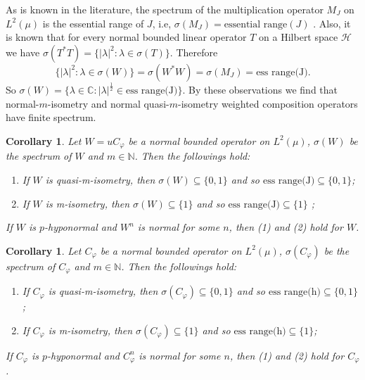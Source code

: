 \documentclass{amsart}
\newtheorem{cor}[thm]{Corollary}
\theoremstyle{definition}\newtheorem{defn}[thm]{Definition}
\theoremstyle{remark}
\numberwithin{equation}{section}
\begin{document}
As is known in the literature, the spectrum of the multiplication operator $M_J$ on $L^2(\mu)$ is the essential range of $J$, i.e, $\sigma(M_J)=\text{essential range}(J)$ . Also, it is known that for every normal bounded linear operator $T$ on a Hilbert space $\mathcal{H}$ we have $\sigma(T^*T)=\{|\lambda|^2:\lambda\in \sigma(T)\}$. Therefore 
$$\{|\lambda|^2:\lambda\in \sigma(W)\}=\sigma(W^*W)=\sigma(M_J)=\text{ess\ range(J)}.$$
So $\sigma(W)=\{\lambda\in \mathbb{C}: |\lambda|^{\frac{1}{2}}\in \text{ess\ range(J)}\}$. By these observations we find that normal-$m$-isometry and normal quasi-$m$-isometry weighted composition operators have finite spectrum.
\begin{cor}
Let $W=uC_{\varphi}$ be a normal bounded operator on $L^2(\mu)$, $\sigma(W)$ be the spectrum of $W$ and $m\in \mathbb{N}$. Then the followings hold:\\
\begin{enumerate}
\item If $W$ is quasi-m-isometry, then $\sigma(W)\subseteq \{0,1\}$ and so $\text{ess\ range(J)}\subseteq \{0,1\}$;

\item If $W$ is m-isometry, then $\sigma(W)\subseteq \{1\}$ and so $\text{ess\ range(J)}\subseteq \{1\}$ ;
\end{enumerate}
 If $W$ is $p$-hyponormal and $W^n$ is normal for some $n$, then (1) and (2) hold for $W$.

\end{cor}

\begin{cor}
Let $C_{\varphi}$ be a normal bounded operator on $L^2(\mu)$, $\sigma(C_{\varphi})$ be the spectrum of $C_{\varphi}$ and $m\in \mathbb{N}$. Then the followings hold:\\
\begin{enumerate}
\item If $C_{\varphi}$ is quasi-m-isometry, then $\sigma(C_{\varphi})\subseteq \{0,1\}$ and so $\text{ess\ range(h)}\subseteq \{0,1\}$;

\item If $C_{\varphi}$ is m-isometry, then $\sigma(C_{\varphi})\subseteq \{1\}$ and so $\text{ess\ range(h)}\subseteq\{1\}$;
\end{enumerate}
If $C_{\varphi}$ is $p$-hyponormal and $C_{\varphi}^n$ is normal for some $n$, then (1) and (2) hold for $C_{\varphi}$.

\end{cor}
\end{document}
